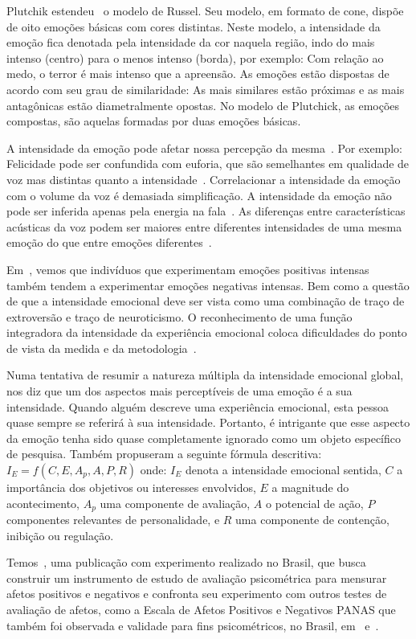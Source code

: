 Plutchik estendeu~\cite{57} o modelo de Russel. Seu modelo, em formato de cone, dispõe de oito emoções básicas com cores distintas. Neste modelo, a intensidade da emoção fica denotada pela intensidade da cor naquela região, indo do mais intenso (centro) para o menos intenso (borda), por exemplo: Com relação ao medo, o terror é mais intenso que a apreensão. As emoções estão dispostas de acordo com seu grau de similaridade: As mais similares estão próximas e as mais antagônicas estão diametralmente opostas. No modelo de Plutchick, as emoções compostas, são aquelas formadas por duas emoções básicas.

A intensidade da emoção pode afetar nossa percepção da mesma~\cite{18.46}. Por exemplo: Felicidade pode ser confundida com euforia, que são semelhantes em qualidade de voz mas distintas quanto a intensidade~\cite{18.9}. Correlacionar a intensidade da emoção com o volume da voz é demasiada simplificação. A intensidade da emoção não pode ser inferida apenas pela energia na fala~\cite{18.12}. As diferenças entre características acústicas da voz podem ser maiores entre diferentes intensidades de uma mesma emoção do que entre emoções diferentes~\cite{18.46}. 

Em~\cite{emoint1}, vemos que indivíduos que experimentam emoções positivas intensas também tendem a experimentar emoções negativas intensas. Bem como a questão de que a intensidade emocional deve ser vista como uma combinação de traço de extroversão e traço de neuroticismo. O reconhecimento de uma função integradora da intensidade da experiência emocional coloca dificuldades do ponto de vista da medida e da metodologia~\cite{emoint2}.

Numa tentativa de resumir a natureza múltipla da intensidade emocional global,~\cite{emoint2.1} nos diz que um dos aspectos mais perceptíveis de uma emoção é a sua intensidade. Quando alguém descreve uma experiência emocional, esta pessoa quase sempre se referirá à sua intensidade. Portanto, é intrigante que esse aspecto da emoção tenha sido quase completamente ignorado como um objeto específico de pesquisa. Também propuseram a seguinte fórmula descritiva: $I_E = f(C, E, A_p, A, P, R)$ onde: $I_E$ denota a intensidade emocional sentida, $C$ a importância dos objetivos ou interesses envolvidos, $E$ a magnitude do acontecimento, $A_p$ uma componente de avaliação, $A$ o potencial de ação, $P$ componentes relevantes de personalidade, e $R$ uma componente de contenção, inibição ou regulação.

Temos~\cite{emoint3}, uma publicação com experimento realizado no Brasil, que busca construir um instrumento de estudo de avaliação psicométrica para mensurar afetos positivos e negativos e confronta seu experimento com outros testes de avaliação de afetos, como a Escala de Afetos Positivos e Negativos \acrshort{PANAS} que também foi observada e validade para fins psicométricos, no Brasil, em~\cite{panas1} e~\cite{panas2}.


